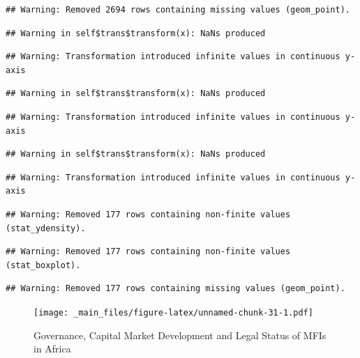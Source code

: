\documentclass[a4paper,nobind]{templates/ociamthesis}
\begin{document}
\begin{landscape}
\begin{verbatim}
## Warning: Removed 2694 rows containing missing values (geom_point).
\end{verbatim}

\begin{verbatim}
## Warning in self$trans$transform(x): NaNs produced
\end{verbatim}

\begin{verbatim}
## Warning: Transformation introduced infinite values in continuous y-axis
\end{verbatim}

\begin{verbatim}
## Warning in self$trans$transform(x): NaNs produced
\end{verbatim}

\begin{verbatim}
## Warning: Transformation introduced infinite values in continuous y-axis
\end{verbatim}

\begin{verbatim}
## Warning in self$trans$transform(x): NaNs produced
\end{verbatim}

\begin{verbatim}
## Warning: Transformation introduced infinite values in continuous y-axis
\end{verbatim}

\begin{verbatim}
## Warning: Removed 177 rows containing non-finite values (stat_ydensity).
\end{verbatim}

\begin{verbatim}
## Warning: Removed 177 rows containing non-finite values (stat_boxplot).
\end{verbatim}

\begin{verbatim}
## Warning: Removed 177 rows containing missing values (geom_point).
\end{verbatim}

\begin{figure}
\centering
\texttt{[image: \_main\_files/figure-latex/unnamed-chunk-31-1.pdf]}
\caption{\label{fig:unnamed-chunk-31}Governance, Capital Market Development and Legal Status of MFIs in Africa}
\end{figure}

\end{landscape}
\end{document}
